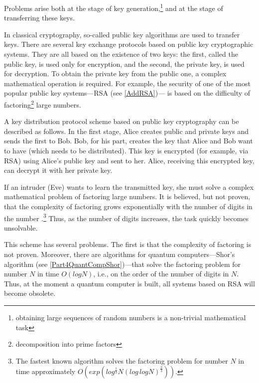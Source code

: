Problems arise both at the stage of key generation,\footnote{obtaining large sequences of random numbers is a non-trivial mathematical task} and at the stage of transferring these keys.

In classical cryptography, so-called public key algorithms are used to transfer keys. There are several key exchange protocols based on public key cryptographic systems. They are all based on the existence of two keys: the first, called the public key, is used only for encryption, and the second, the private key, is used for decryption. To obtain the private key from the public one, a complex mathematical operation is required. For example, the security of one of the most popular public key systems—RSA (see \ref {AddRSA})— is based on the difficulty of factoring\footnote{decomposition into prime factors} large numbers.

A key distribution protocol scheme based on public key cryptography can be described as follows. In the first stage, Alice creates public and private keys and sends the first to Bob. Bob, for his part, creates the key that Alice and Bob want to have (which needs to be distributed). This key is encrypted (for example, via RSA) using Alice's public key and sent to her. Alice, receiving this encrypted key, can decrypt it with her private key.

If an intruder (Eve) wants to learn the transmitted key, she must solve a complex mathematical problem of factoring large numbers. It is believed, but not proven, that the complexity of factoring grows exponentially with the number of digits in the number \cite{bPhisQuantInfo}.\footnote{The fastest known algorithm solves the factoring problem for number $N$ in time approximately $O\left(exp\left(log^{\frac{1}{3}}N\left(log \, log N\right)^{\frac{2}{3}}\right)\right)$.} Thus, as the number of digits increases, the task quickly becomes unsolvable.

This scheme has several problems. The first is that the complexity of factoring is not proven. Moreover, there are algorithms for quantum computers—Shor's algorithm (see \ref {Part4QuantCompShor})—that solve the factoring problem for number $N$ in time $O\left(log N\right)$, i.e., on the order of the number of digits in $N$. Thus, at the moment a quantum computer is built, all systems based on RSA  will become obsolete.